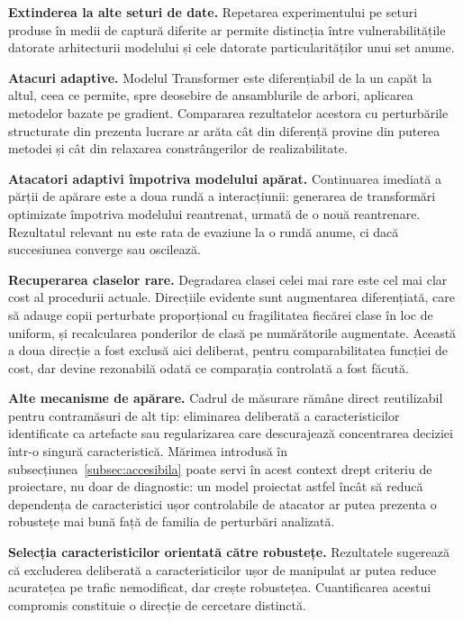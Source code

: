 \textbf{Extinderea la alte seturi de date.} Repetarea experimentului pe seturi produse în medii de captură diferite ar permite distincția între vulnerabilitățile datorate arhitecturii modelului și cele datorate particularităților unui set anume.

\textbf{Atacuri adaptive.} Modelul Transformer este diferențiabil de la un capăt la altul, ceea ce permite, spre deosebire de ansamblurile de arbori, aplicarea metodelor bazate pe gradient. Compararea rezultatelor acestora cu perturbările structurate din prezenta lucrare ar arăta cât din diferență provine din puterea metodei și cât din relaxarea constrângerilor de realizabilitate.

\textbf{Atacatori adaptivi împotriva modelului apărat.} Continuarea imediată a părții de apărare este a doua rundă a interacțiunii: generarea de transformări optimizate împotriva modelului reantrenat, urmată de o nouă reantrenare. Rezultatul relevant nu este rata de evaziune la o rundă anume, ci dacă succesiunea converge sau oscilează.

\textbf{Recuperarea claselor rare.} Degradarea clasei celei mai rare este cel mai clar cost al procedurii actuale. Direcțiile evidente sunt augmentarea diferențiată, care să adauge copii perturbate proporțional cu fragilitatea fiecărei clase în loc de uniform, și recalcularea ponderilor de clasă pe numărătorile augmentate. Această a doua direcție a fost exclusă aici deliberat, pentru comparabilitatea funcției de cost, dar devine rezonabilă odată ce comparația controlată a fost făcută.

\textbf{Alte mecanisme de apărare.} Cadrul de măsurare rămâne direct reutilizabil pentru contramăsuri de alt tip: eliminarea deliberată a caracteristicilor identificate ca artefacte sau regularizarea care descurajează concentrarea deciziei într-o singură caracteristică. Mărimea introdusă în subsecțiunea~\ref{subsec:accesibila} poate servi în acest context drept criteriu de proiectare, nu doar de diagnostic: un model proiectat astfel încât să reducă dependența de caracteristici ușor controlabile de atacator ar putea prezenta o robustețe mai bună față de familia de perturbări analizată.

\textbf{Selecția caracteristicilor orientată către robustețe.} Rezultatele sugerează că excluderea deliberată a caracteristicilor ușor de manipulat ar putea reduce acuratețea pe trafic nemodificat, dar crește robustețea. Cuantificarea acestui compromis constituie o direcție de cercetare distinctă.
